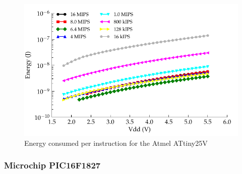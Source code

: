 \begin{figure}
\begin{centering}
\includegraphics{content/appendices/microprocessorPowerMeasurements/graphics/Graph_ATtiny25V_Clock_JPI}
\par\end{centering}

\protect\caption{
\label{fig:ATtiny25VClkJPI}Energy consumed per instruction for the
Atmel ATtiny25V
}


\end{figure}



\subsubsection*{Microchip PIC16F1827}

